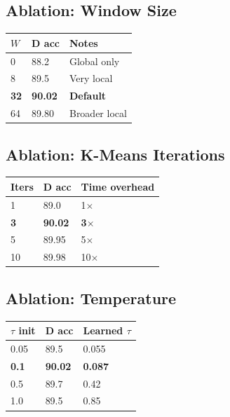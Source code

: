 \subsection{Ablation: Window Size}

\begin{table}[H]
\centering
\small
\begin{tabular}{lll}
\toprule
\textbf{$W$} & \textbf{D acc} & \textbf{Notes} \\
\midrule
0 & 88.2 & Global only \\
8 & 89.5 & Very local \\
\textbf{32} & \textbf{90.02} & \textbf{Default} \\
64 & 89.80 & Broader local \\
\bottomrule
\end{tabular}
\end{table}

\subsection{Ablation: K-Means Iterations}

\begin{table}[H]
\centering
\small
\begin{tabular}{lll}
\toprule
\textbf{Iters} & \textbf{D acc} & \textbf{Time overhead} \\
\midrule
1 & 89.0 & 1$\times$ \\
\textbf{3} & \textbf{90.02} & \textbf{3$\times$} \\
5 & 89.95 & 5$\times$ \\
10 & 89.98 & 10$\times$ \\
\bottomrule
\end{tabular}
\end{table}

\subsection{Ablation: Temperature}

\begin{table}[H]
\centering
\small
\begin{tabular}{lll}
\toprule
\textbf{$\tau$ init} & \textbf{D acc} & \textbf{Learned $\tau$} \\
\midrule
0.05 & 89.5 & 0.055 \\
\textbf{0.1} & \textbf{90.02} & \textbf{0.087} \\
0.5 & 89.7 & 0.42 \\
1.0 & 89.5 & 0.85 \\
\bottomrule
\end{tabular}
\end{table}

